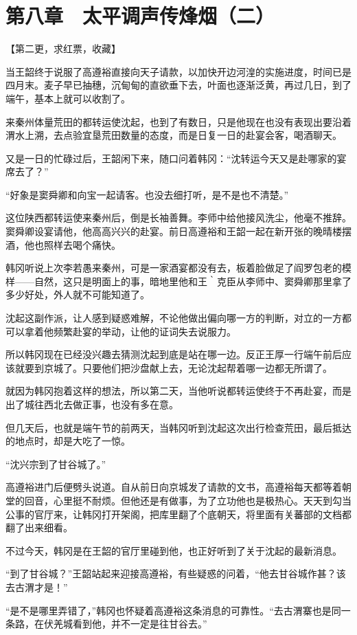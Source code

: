\section{第八章　太平调声传烽烟（二）}

【第二更，求红票，收藏】

当王韶终于说服了高遵裕直接向天子请款，以加快开边河湟的实施进度，时间已是四月末。麦子早已抽穗，沉甸甸的直欲垂下去，叶面也逐渐泛黄，再过几日，到了端午，基本上就可以收割了。

来秦州体量荒田的都转运使沈起，也到了有数日，只是他现在也没有表现出要沿着渭水上溯，去点验宜垦荒田数量的态度，而是日复一日的赴宴会客，喝酒聊天。

又是一日的忙碌过后，王韶闲下来，随口问着韩冈：“沈转运今天又是赴哪家的宴席去了？”

“好象是窦舜卿和向宝一起请客。也没去细打听，是不是也不清楚。”

这位陕西都转运使来秦州后，倒是长袖善舞。李师中给他接风洗尘，他毫不推辞。窦舜卿设宴请他，他高高兴兴的赴宴。前日高遵裕和王韶一起在新开张的晚晴楼摆酒，他也照样去喝个痛快。

韩冈听说上次李若愚来秦州，可是一家酒宴都没有去，板着脸做足了阎罗包老的模样——自然，这只是明面上的事，暗地里他和王｀克臣从李师中、窦舜卿那里拿了多少好处，外人就不可能知道了。

沈起这副作派，让人感到疑惑难解，不论他做出偏向哪一方的判断，对立的一方都可以拿着他频繁赴宴的举动，让他的证词失去说服力。

所以韩冈现在已经没兴趣去猜测沈起到底是站在哪一边。反正王厚一行端午前后应该就要到京城了。只要他们把沙盘献上去，无论沈起帮着哪一边都无所谓了。

就因为韩冈抱着这样的想法，所以第二天，当他听说都转运使终于不再赴宴，而是出了城往西北去做正事，也没有多在意。

但几天后，也就是端午节的前两天，当韩冈听到沈起这次出行检查荒田，最后抵达的地点时，却是大吃了一惊。

“沈兴宗到了甘谷城了。”

高遵裕进门后便劈头说道。自从前日向京城发了请款的文书，高遵裕每天都等着朝堂的回音，心里挺不耐烦。但他还是有做事，为了立功他也是极热心。天天到勾当公事的官厅来，让韩冈打开架阁，把库里翻了个底朝天，将里面有关蕃部的文档都翻了出来细看。

不过今天，韩冈是在王韶的官厅里碰到他，也正好听到了关于沈起的最新消息。

“到了甘谷城？”王韶站起来迎接高遵裕，有些疑惑的问着，“他去甘谷城作甚？该去古渭才是！”

“是不是哪里弄错了，”韩冈也怀疑着高遵裕这条消息的可靠性。“去古渭寨也是同一条路，在伏羌城看到他，并不一定是往甘谷去。”

